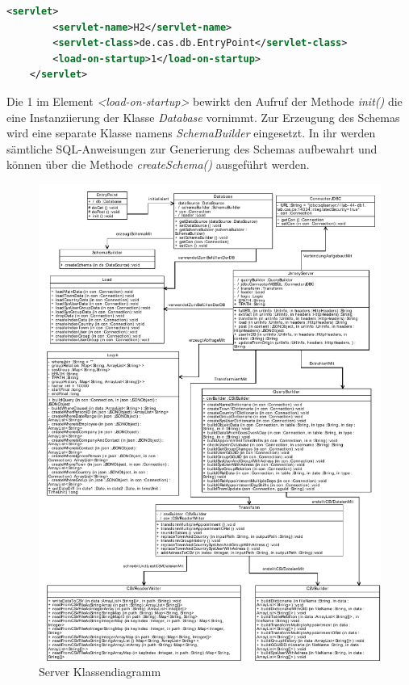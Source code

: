 \begin{lstlisting}[language=XML]
	<servlet>
		<servlet-name>H2</servlet-name>
		<servlet-class>de.cas.db.EntryPoint</servlet-class>
		<load-on-startup>1</load-on-startup>
	</servlet>
\end{lstlisting}

Die 1 im Element \textit{<load-on-startup>} bewirkt den Aufruf der Methode \textit{init()} die eine Instanziierung der Klasse \textit{Database} vornimmt. Zur Erzeugung des Schemas wird eine separate Klasse namens \textit{SchemaBuilder} eingesetzt. In ihr werden sämtliche SQL-Anweisungen zur Generierung des Schemas aufbewahrt und können über die Methode \textit{createSchema()} ausgeführt werden.

\begin{figure}[htbp]
\begin{center}
\includegraphics[width=1.0\textwidth]{pics/ServerKlassendiagramm.pdf}
\caption{Server Klassendiagramm}
\label{umsetzung_klassendiagramm_server}
\end{center}
\end{figure}

